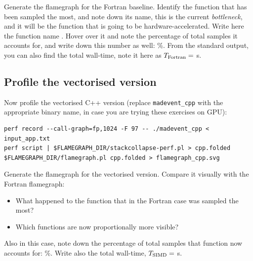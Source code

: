 \documentclass[11pt,a4paper]{article}
\begin{document}
\begin{exercisebox}[Exercise 4a]
Generate the flamegraph for the Fortran baseline.
Identify the function that has been sampled the most, and note down its name, this is the current \emph{bottleneck}, and it will be the function that is going to be hardware-accelerated.
Write here the function name \TextField[name=fortran_bottleneck, width=4cm]{}.
Hover over it and note the percentage of total samples it accounts for, and write down this number as well: \TextField[name=fortran_bottleneck_percentage, width=1.5cm]{}\%.
From the standard output, you can also find the total wall-time, note it here as $T_\textup{Fortran} =$ \TextField[name=time_fortran, width=1.5cm]{} s.
\end{exercisebox}

\subsection{Profile the vectorised version}
\label{sec:profile_cpp}

Now profile the vectorised C++ version (replace \texttt{madevent\_cpp} with the appropriate binary name, in case you are trying these exercises on GPU):

\begin{lstlisting}[style=bashstyle]
perf record --call-graph=fp,1024 -F 97 -- ./madevent_cpp < input_app.txt
perf script | $FLAMEGRAPH_DIR/stackcollapse-perf.pl > cpp.folded
$FLAMEGRAPH_DIR/flamegraph.pl cpp.folded > flamegraph_cpp.svg
\end{lstlisting}

\begin{exercisebox}[Exercise 4b]
Generate the flamegraph for the vectorised version.
Compare it visually with the Fortran flamegraph:
\begin{itemize}[nosep]
    \item What happened to the function that in the Fortran case was sampled the most?
    \item Which functions are now proportionally more visible?
\end{itemize}
Also in this case, note down the percentage of total samples that function now accounts for: \TextField[name=cpp_bottleneck_percentage, width=1.5cm]{}\%.
Write also the total wall-time, $T_\textup{SIMD} =$ \TextField[name=time_cpp, width=1.5cm]{} s.

\vspace{3mm}

\TextField[name=exercise_4b_notes, height=3cm, width=\linewidth, multiline, value={...notes...}]{}
\end{exercisebox}
\end{document}
